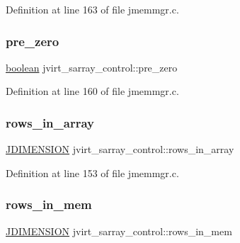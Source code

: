 Definition at line 163 of file jmemmgr.\+c.

\mbox{\label{structjvirt__sarray__control_a59c4935ba4bbb52f9c72350a0eab41ce}} 
\subsubsection{\texorpdfstring{pre\_zero}{pre\_zero}}
{\footnotesize\ttfamily \mbox{\hyperlink{jmorecfg_8h_a7c6368b321bd9acd0149b030bb8275ed}{boolean}} jvirt\+\_\+sarray\+\_\+control\+::pre\+\_\+zero}



Definition at line 160 of file jmemmgr.\+c.

\mbox{\label{structjvirt__sarray__control_a17d42465a9cedfd4feeb93edfd8d134a}} 
\subsubsection{\texorpdfstring{rows\_in\_array}{rows\_in\_array}}
{\footnotesize\ttfamily \mbox{\hyperlink{jmorecfg_8h_a04ed4674f6f1d0d50ec241531e38274f}{J\+D\+I\+M\+E\+N\+S\+I\+ON}} jvirt\+\_\+sarray\+\_\+control\+::rows\+\_\+in\+\_\+array}



Definition at line 153 of file jmemmgr.\+c.

\mbox{\label{structjvirt__sarray__control_aac15348d4b307c8aacc631b96aa3b547}} 
\subsubsection{\texorpdfstring{rows\_in\_mem}{rows\_in\_mem}}
{\footnotesize\ttfamily \mbox{\hyperlink{jmorecfg_8h_a04ed4674f6f1d0d50ec241531e38274f}{J\+D\+I\+M\+E\+N\+S\+I\+ON}} jvirt\+\_\+sarray\+\_\+control\+::rows\+\_\+in\+\_\+mem}



